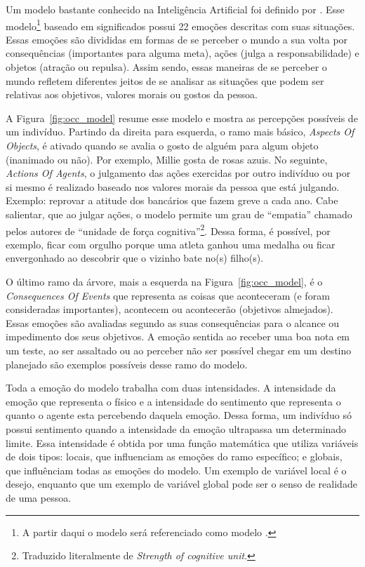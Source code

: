 Um modelo bastante conhecido na Inteligência Artificial foi definido por
\citet{ortony1988cse}. Esse modelo\footnote{A partir daqui o modelo será
referenciado como modelo \occ.} baseado em significados possui 22 emoções
descritas com suas situações. Essas emoções são divididas em
formas de se perceber o mundo a sua volta por consequências (importantes para
alguma meta), ações (julga a responsabilidade) e objetos (atração ou repulsa).
Assim sendo, essas maneiras de se perceber o mundo refletem diferentes jeitos
de se analisar as situações que podem ser relativas aos objetivos, valores
morais ou gostos da pessoa.

A Figura~\ref{fig:occ_model} resume esse modelo e mostra as
percepções possíveis de um indivíduo.  Partindo da direita para esquerda, o
ramo mais básico, \emph{Aspects Of Objects}, é ativado quando se avalia o
gosto de alguém para algum objeto (inanimado ou não). Por exemplo, Millie
gosta de rosas azuis. No seguinte, \emph{Actions Of Agents}, o julgamento das
ações exercidas por outro indivíduo ou por si mesmo é realizado baseado nos
valores morais da pessoa que está julgando. Exemplo: reprovar a atitude dos
bancários que fazem greve a cada ano. Cabe salientar, que ao julgar ações, o
modelo permite um grau de ``empatia'' chamado pelos autores de ``unidade de
força cognitiva''\footnote{Traduzido literalmente de \emph{Strength of
cognitive unit}.}. Dessa forma, é possível, por exemplo, ficar com orgulho
porque uma atleta ganhou uma medalha ou ficar envergonhado ao descobrir que o
vizinho bate no(s) filho(s).

O último ramo da árvore, mais a esquerda na Figura~\ref{fig:occ_model}, é o
\emph{Consequences Of Events} que representa as coisas que aconteceram (e
foram consideradas importantes), acontecem ou acontecerão (objetivos
almejados)\dev{}. Essas emoções são avaliadas segundo as suas consequências
para o alcance ou impedimento dos seus objetivos. A emoção sentida ao receber
uma boa nota em um teste, ao ser assaltado ou ao perceber não ser possível
chegar em um destino planejado são exemplos possíveis desse ramo do modelo.

Toda a emoção do modelo trabalha com duas intensidades. A intensidade da
emoção que representa o físico e a intensidade do sentimento que representa o
quanto o agente esta percebendo daquela emoção. Dessa forma, um indivíduo só
possui sentimento quando a intensidade da emoção ultrapassa um
determinado limite\dev{}.  Essa intensidade é obtida por uma função matemática
que utiliza variáveis de dois tipos: locais, que influenciam as emoções do ramo
específico; e globais, que influênciam todas as emoções do modelo.  Um exemplo
de variável local é o desejo, enquanto que um exemplo de variável global pode
ser o senso de realidade de uma pessoa.

